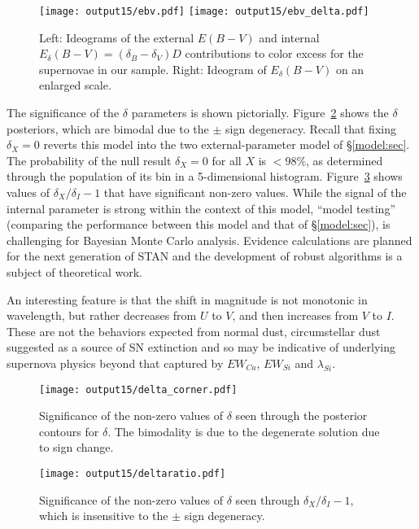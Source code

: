 \documentclass{aastex61}   	%
\begin{document}
\begin{figure}[htbp] %
   \centering
   \texttt{[image: output15/ebv.pdf]}
   \texttt{[image: output15/ebv\_delta.pdf]}
      \caption{Left: Ideograms of the external $E(B-V)$ and
   internal $E_\delta(B-V) = (\delta_B-\delta_V)D$  contributions to color excess  for the supernovae in our sample.
   Right: Ideogram of $E_\delta(B-V)$ on an enlarged scale.
   \label{ebv:fig}}
\end{figure}
The significance of the $\delta$ parameters is shown pictorially.
Figure~\ref{deltacorner:fig} shows the $\delta$ posteriors, which are bimodal due to the $\pm$ sign degeneracy.
\color{red}
Recall that fixing $\delta_X=0$ reverts this model into the two external-parameter model of \S\ref{model:sec}.
\color{black}
The probability
of the null result $\delta_X=0$ for all $X$ is $<98\%$, as determined through
the population of its bin in a 5-dimensional histogram.
Figure~\ref{deltaratio:fig} shows  values of $\delta_X/\delta_I-1$ that  have significant non-zero values. 
\color{red}
While the signal of the internal parameter is strong within the context of this model, ``model testing'' (comparing the
performance  between this model
and that of \S\ref{model:sec}), is challenging for Bayesian Monte Carlo analysis.  Evidence calculations are planned
for the next generation of STAN and the development of robust algorithms is a subject of theoretical work.
\color{black}

An interesting feature
is that the shift in magnitude is not monotonic in wavelength, but rather decreases from $U$ to $V$, and then increases from $V$
to $I$.
These are not the behaviors expected from normal dust,
circumstellar dust suggested as a source of SN extinction \citep{2005ApJ...635L..33W,2008ApJ...686L.103G,
2015ApJ...807L..26G} and so may be indicative of underlying supernova physics beyond that captured by $EW_{Ca}$, $EW_{Si}$ and
$\lambda_{Si}$.

\begin{figure}[htbp] %
   \centering
   \texttt{[image: output15/delta\_corner.pdf]}
   \caption{Significance of the non-zero values of $\delta$ seen through the posterior contours for $\delta$.  The bimodality is due to the degenerate solution due to sign change.
   \label{deltacorner:fig}}
\end{figure}


\begin{figure}[htbp] %
   \centering
      \texttt{[image: output15/deltaratio.pdf]}
   \caption{Significance of the non-zero values of $\delta$ seen through $\delta_X/\delta_I-1$, which is insensitive to the $\pm$ sign degeneracy.
   \label{deltaratio:fig}}
\end{figure}
\end{document}
